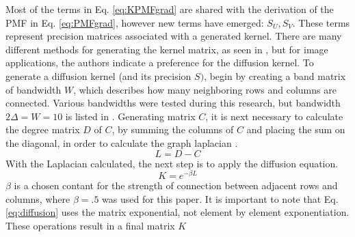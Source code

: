 \documentclass[journal]{IEEEtran}
\begin{document}
Most of the terms in Eq. \ref{eq:KPMFgrad} are shared with the derivation of the PMF in Eq. \ref{eq:PMFgrad}, however new terms have emerged: 
\begin{math}S_U, S_V\end{math}. These terms represent precision matrices associated with a generated kernel. There are many different methods for
generating the kernel matrix, as seen in \cite{KPMFpaper}, but for image applications, the authors indicate a preference for the diffusion
kernel. To generate a diffusion kernel (and its precision \begin{math}S)\end{math}, begin by creating a band matrix of bandwidth \begin{math}W\end{math},
which describes how many neighboring rows and columns are connected. Various bandwidths were tested during this research, but bandwidth 
\begin{math}2\Delta = W = 10\end{math} is listed in \cite{KPMFpaper}. Generating matrix \begin{math}C\end{math}, it is next necessary to calculate
the degree matrix \begin{math}D\end{math} of \begin{math}C\end{math}, by summing the columns of \begin{math}C\end{math} and placing the sum on the 
diagonal, in order to calculate the graph laplacian \cite{Laplacian}.
\begin{equation}
    L = D - C
\end{equation}
With the Laplacian calculated, the next step is to apply the diffusion equation. 
\begin{equation}
K = e^{-\beta L}
\label{eq:diffusion}
\end{equation}
\begin{math}\beta\end{math} is a chosen contant for the strength of connection between adjacent rows and columns, where  
\begin{math}\beta = .5\end{math} was used for this paper.
It is important to note that Eq. \ref{eq:diffusion} uses the matrix exponential, not element by element exponentiation. 
These operations result in a final matrix \begin{math}K\end{math} 
\end{document}
